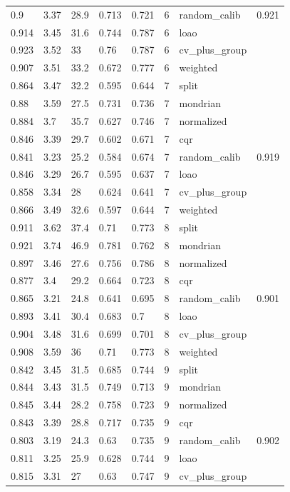 \begin{tabular}{llllllll}
0.9 & 3.37 & 28.9 & 0.713 & 0.721 & 6 & random\_calib & 0.921 \\
0.914 & 3.45 & 31.6 & 0.744 & 0.787 & 6 & loao &  \\
0.923 & 3.52 & 33 & 0.76 & 0.787 & 6 & cv\_plus\_group &  \\
0.907 & 3.51 & 33.2 & 0.672 & 0.777 & 6 & weighted &  \\
0.864 & 3.47 & 32.2 & 0.595 & 0.644 & 7 & split &  \\
0.88 & 3.59 & 27.5 & 0.731 & 0.736 & 7 & mondrian &  \\
0.884 & 3.7 & 35.7 & 0.627 & 0.746 & 7 & normalized &  \\
0.846 & 3.39 & 29.7 & 0.602 & 0.671 & 7 & cqr &  \\
0.841 & 3.23 & 25.2 & 0.584 & 0.674 & 7 & random\_calib & 0.919 \\
0.846 & 3.29 & 26.7 & 0.595 & 0.637 & 7 & loao &  \\
0.858 & 3.34 & 28 & 0.624 & 0.641 & 7 & cv\_plus\_group &  \\
0.866 & 3.49 & 32.6 & 0.597 & 0.644 & 7 & weighted &  \\
0.911 & 3.62 & 37.4 & 0.71 & 0.773 & 8 & split &  \\
0.921 & 3.74 & 46.9 & 0.781 & 0.762 & 8 & mondrian &  \\
0.897 & 3.46 & 27.6 & 0.756 & 0.786 & 8 & normalized &  \\
0.877 & 3.4 & 29.2 & 0.664 & 0.723 & 8 & cqr &  \\
0.865 & 3.21 & 24.8 & 0.641 & 0.695 & 8 & random\_calib & 0.901 \\
0.893 & 3.41 & 30.4 & 0.683 & 0.7 & 8 & loao &  \\
0.904 & 3.48 & 31.6 & 0.699 & 0.701 & 8 & cv\_plus\_group &  \\
0.908 & 3.59 & 36 & 0.71 & 0.773 & 8 & weighted &  \\
0.842 & 3.45 & 31.5 & 0.685 & 0.744 & 9 & split &  \\
0.844 & 3.43 & 31.5 & 0.749 & 0.713 & 9 & mondrian &  \\
0.845 & 3.44 & 28.2 & 0.758 & 0.723 & 9 & normalized &  \\
0.843 & 3.39 & 28.8 & 0.717 & 0.735 & 9 & cqr &  \\
0.803 & 3.19 & 24.3 & 0.63 & 0.735 & 9 & random\_calib & 0.902 \\
0.811 & 3.25 & 25.9 & 0.628 & 0.744 & 9 & loao &  \\
0.815 & 3.31 & 27 & 0.63 & 0.747 & 9 & cv\_plus\_group &  \\

\end{tabular}
